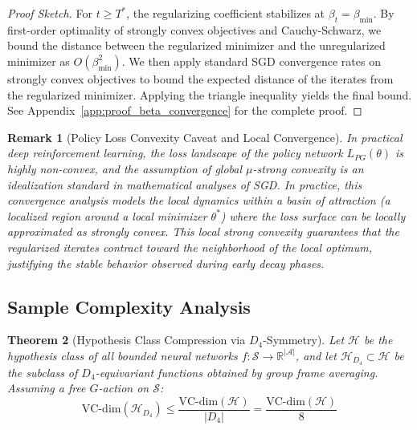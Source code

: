 \documentclass{article}
\newtheorem{theorem}{Theorem}[section]
\newtheorem{remark}[theorem]{Remark}
\begin{document}
\begin{proof}[Proof Sketch]
For $t \geq T^*$, the regularizing coefficient stabilizes at $\beta_t = \beta_{\min}$. By first-order optimality of strongly convex objectives and Cauchy-Schwarz, we bound the distance between the regularized minimizer and the unregularized minimizer as $O(\beta_{\min}^2)$. We then apply standard SGD convergence rates on strongly convex objectives to bound the expected distance of the iterates from the regularized minimizer. Applying the triangle inequality yields the final bound. See Appendix~\ref{app:proof_beta_convergence} for the complete proof.
\end{proof}

\begin{remark}[Policy Loss Convexity Caveat and Local Convergence]
In practical deep reinforcement learning, the loss landscape of the policy network $L_{PG}(\theta)$ is highly non-convex, and the assumption of global $\mu$-strong convexity is an idealization standard in mathematical analyses of SGD. In practice, this convergence analysis models the local dynamics within a basin of attraction (a localized region around a local minimizer $\theta^*$) where the loss surface can be locally approximated as strongly convex. This local strong convexity guarantees that the regularized iterates contract toward the neighborhood of the local optimum, justifying the stable behavior observed during early decay phases.
\end{remark}

\subsection{Sample Complexity Analysis}

\begin{theorem}[Hypothesis Class Compression via $D_4$-Symmetry]\label{thm:sample_complexity}
Let $\mathcal{H}$ be the hypothesis class of all bounded neural networks $f: \mathcal{S} \to \mathbb{R}^{|\mathcal{A}|}$, and let $\mathcal{H}_{D_4} \subset \mathcal{H}$ be the subclass of $D_4$-equivariant functions obtained by group frame averaging. Assuming a free $G$-action on $\mathcal{S}$:
\begin{equation}
    \mathrm{VC}\text{-}\mathrm{dim}(\mathcal{H}_{D_4}) \leq \frac{\mathrm{VC}\text{-}\mathrm{dim}(\mathcal{H})}{|D_4|} = \frac{\mathrm{VC}\text{-}\mathrm{dim}(\mathcal{H})}{8}
\end{equation}
\end{theorem}
\end{document}
